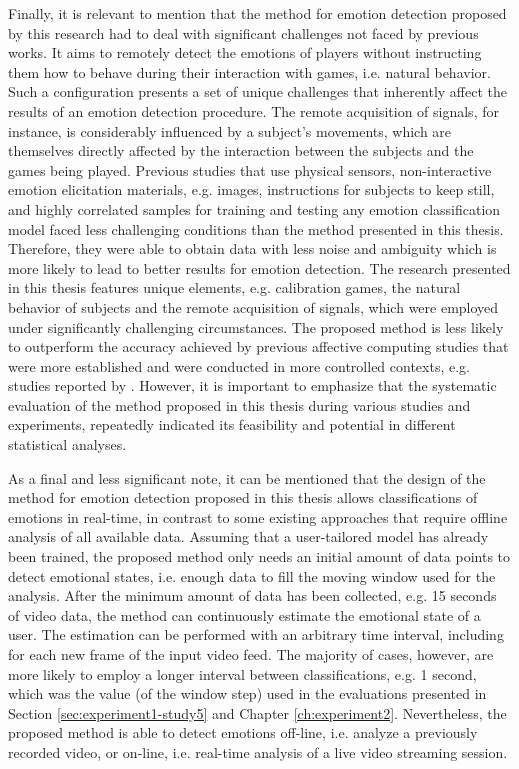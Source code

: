 Finally, it is relevant to mention that the method for emotion detection proposed by this research had to deal with significant challenges not faced by previous works. It aims to remotely detect the emotions of players without instructing them how to behave during their interaction with games, i.e. natural behavior. Such a configuration presents a set of unique challenges that inherently affect the results of an emotion detection procedure. The remote acquisition of signals, for instance, is considerably influenced by a subject's movements, which are themselves directly affected by the interaction between the subjects and the games being played. Previous studies that use physical sensors, non-interactive emotion elicitation materials, e.g. images, instructions for subjects to keep still, and highly correlated samples for training and testing any emotion classification model faced less challenging conditions than the method presented in this thesis. Therefore, they were able to obtain data with less noise and ambiguity which is more likely to lead to better results for emotion detection. The research presented in this thesis features unique elements, e.g. calibration games, the natural behavior of subjects and the remote acquisition of signals, which were employed under significantly challenging circumstances. The proposed method is less likely to outperform the accuracy achieved by previous affective computing studies that were more established and were conducted in more controlled contexts, e.g. studies reported by \textcite{moghimi2017affective}. However, it is important to emphasize that the systematic evaluation of the method proposed in this thesis during various studies and experiments, repeatedly indicated its feasibility and potential in different statistical analyses.

As a final and less significant note, it can be mentioned that the design of the method for emotion detection proposed in this thesis allows classifications of emotions in real-time, in contrast to some existing approaches that require offline analysis of all available data. Assuming that a user-tailored model has already been trained, the proposed method only needs an initial amount of data points to detect emotional states, i.e. enough data to fill the moving window used for the analysis. After the minimum amount of data has been collected, e.g. 15 seconds of video data, the method can continuously estimate the emotional state of a user. The estimation can be performed with an arbitrary time interval, including for each new frame of the input video feed. The majority of cases, however, are more likely to employ a longer interval between classifications, e.g. 1 second, which was the value (of the window step) used in the evaluations presented in Section \ref{sec:experiment1-study5} and Chapter \ref{ch:experiment2}. Nevertheless, the proposed method is able to detect emotions off-line, i.e. analyze a previously recorded video, or on-line, i.e. real-time analysis of a live video streaming session.

